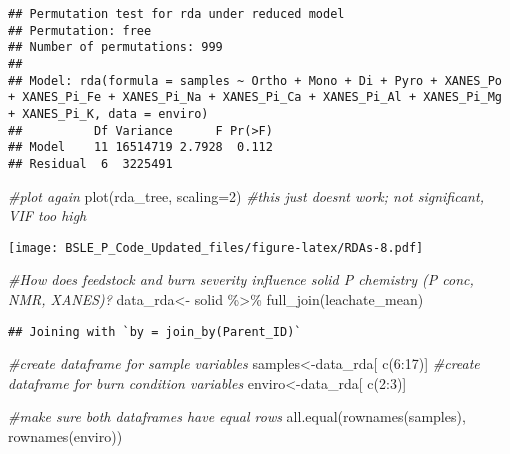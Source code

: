 \documentclass[
]{article}
\newenvironment{Shaded}{\begin{snugshade}}{\end{snugshade}}
\newcommand{\AttributeTok}[1]{\textcolor[rgb]{0.77,0.63,0.00}{#1}}
\newcommand{\CommentTok}[1]{\textcolor[rgb]{0.56,0.35,0.01}{\textit{#1}}}
\newcommand{\DecValTok}[1]{\textcolor[rgb]{0.00,0.00,0.81}{#1}}
\newcommand{\FunctionTok}[1]{\textcolor[rgb]{0.00,0.00,0.00}{#1}}
\newcommand{\NormalTok}[1]{#1}
\newcommand{\OtherTok}[1]{\textcolor[rgb]{0.56,0.35,0.01}{#1}}
\newcommand{\SpecialCharTok}[1]{\textcolor[rgb]{0.00,0.00,0.00}{#1}}
\begin{document}
\begin{verbatim}
## Permutation test for rda under reduced model
## Permutation: free
## Number of permutations: 999
## 
## Model: rda(formula = samples ~ Ortho + Mono + Di + Pyro + XANES_Po + XANES_Pi_Fe + XANES_Pi_Na + XANES_Pi_Ca + XANES_Pi_Al + XANES_Pi_Mg + XANES_Pi_K, data = enviro)
##          Df Variance      F Pr(>F)
## Model    11 16514719 2.7928  0.112
## Residual  6  3225491
\end{verbatim}

\begin{Shaded}
\begin{Highlighting}[]
\CommentTok{\#plot again}
\FunctionTok{plot}\NormalTok{(rda\_tree, }\AttributeTok{scaling=}\DecValTok{2}\NormalTok{) }\CommentTok{\#this just doesn\textquotesingle{}t work; not significant, VIF too high}
\end{Highlighting}
\end{Shaded}

\texttt{[image: BSLE\_P\_Code\_Updated\_files/figure-latex/RDAs-8.pdf]}

\begin{Shaded}
\begin{Highlighting}[]
\CommentTok{\#How does feedstock and burn severity influence solid P chemistry (P conc, NMR, XANES)?}
\NormalTok{data\_rda}\OtherTok{\textless{}{-}}\NormalTok{ solid }\SpecialCharTok{\%\textgreater{}\%}
  \FunctionTok{full\_join}\NormalTok{(leachate\_mean) }
\end{Highlighting}
\end{Shaded}

\begin{verbatim}
## Joining with `by = join_by(Parent_ID)`
\end{verbatim}

\begin{Shaded}
\begin{Highlighting}[]
\CommentTok{\#create dataframe for sample variables}
\NormalTok{samples}\OtherTok{\textless{}{-}}\NormalTok{data\_rda[ }\FunctionTok{c}\NormalTok{(}\DecValTok{6}\SpecialCharTok{:}\DecValTok{17}\NormalTok{)]}
\CommentTok{\#create dataframe for burn condition variables}
\NormalTok{enviro}\OtherTok{\textless{}{-}}\NormalTok{data\_rda[ }\FunctionTok{c}\NormalTok{(}\DecValTok{2}\SpecialCharTok{:}\DecValTok{3}\NormalTok{)]}

\CommentTok{\#make sure both dataframes have equal rows}
\FunctionTok{all.equal}\NormalTok{(}\FunctionTok{rownames}\NormalTok{(samples), }\FunctionTok{rownames}\NormalTok{(enviro))}
\end{Highlighting}
\end{Shaded}
\end{document}
